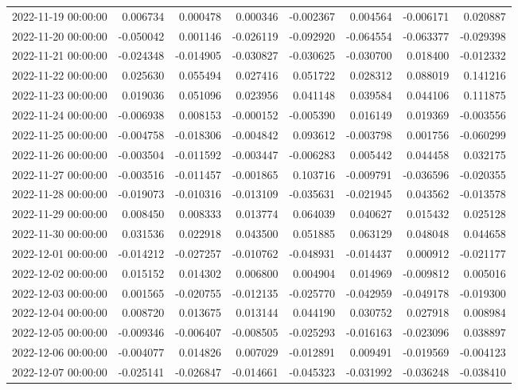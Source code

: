 \begin{tabular}{lrrrrrrr}
2022-11-19 00:00:00 & 0.006734 & 0.000478 & 0.000346 & -0.002367 & 0.004564 & -0.006171 & 0.020887 \\
2022-11-20 00:00:00 & -0.050042 & 0.001146 & -0.026119 & -0.092920 & -0.064554 & -0.063377 & -0.029398 \\
2022-11-21 00:00:00 & -0.024348 & -0.014905 & -0.030827 & -0.030625 & -0.030700 & 0.018400 & -0.012332 \\
2022-11-22 00:00:00 & 0.025630 & 0.055494 & 0.027416 & 0.051722 & 0.028312 & 0.088019 & 0.141216 \\
2022-11-23 00:00:00 & 0.019036 & 0.051096 & 0.023956 & 0.041148 & 0.039584 & 0.044106 & 0.111875 \\
2022-11-24 00:00:00 & -0.006938 & 0.008153 & -0.000152 & -0.005390 & 0.016149 & 0.019369 & -0.003556 \\
2022-11-25 00:00:00 & -0.004758 & -0.018306 & -0.004842 & 0.093612 & -0.003798 & 0.001756 & -0.060299 \\
2022-11-26 00:00:00 & -0.003504 & -0.011592 & -0.003447 & -0.006283 & 0.005442 & 0.044458 & 0.032175 \\
2022-11-27 00:00:00 & -0.003516 & -0.011457 & -0.001865 & 0.103716 & -0.009791 & -0.036596 & -0.020355 \\
2022-11-28 00:00:00 & -0.019073 & -0.010316 & -0.013109 & -0.035631 & -0.021945 & 0.043562 & -0.013578 \\
2022-11-29 00:00:00 & 0.008450 & 0.008333 & 0.013774 & 0.064039 & 0.040627 & 0.015432 & 0.025128 \\
2022-11-30 00:00:00 & 0.031536 & 0.022918 & 0.043500 & 0.051885 & 0.063129 & 0.048048 & 0.044658 \\
2022-12-01 00:00:00 & -0.014212 & -0.027257 & -0.010762 & -0.048931 & -0.014437 & 0.000912 & -0.021177 \\
2022-12-02 00:00:00 & 0.015152 & 0.014302 & 0.006800 & 0.004904 & 0.014969 & -0.009812 & 0.005016 \\
2022-12-03 00:00:00 & 0.001565 & -0.020755 & -0.012135 & -0.025770 & -0.042959 & -0.049178 & -0.019300 \\
2022-12-04 00:00:00 & 0.008720 & 0.013675 & 0.013144 & 0.044190 & 0.030752 & 0.027918 & 0.008984 \\
2022-12-05 00:00:00 & -0.009346 & -0.006407 & -0.008505 & -0.025293 & -0.016163 & -0.023096 & 0.038897 \\
2022-12-06 00:00:00 & -0.004077 & 0.014826 & 0.007029 & -0.012891 & 0.009491 & -0.019569 & -0.004123 \\
2022-12-07 00:00:00 & -0.025141 & -0.026847 & -0.014661 & -0.045323 & -0.031992 & -0.036248 & -0.038410 \\

\end{tabular}
